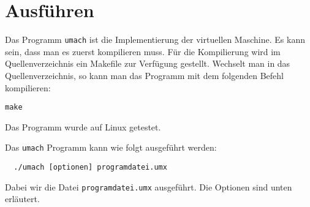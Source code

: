 \section{Ausführen}

Das Programm \texttt{umach} ist die Implementierung der virtuellen Maschine. Es
kann sein, dass man es zuerst kompilieren muss. Für die Kompilierung wird im
Quellenverzeichnis ein Makefile zur Verfügung gestellt. Wechselt man in
das Quellenverzeichnis, so kann man das Programm mit dem folgenden Befehl
kompilieren:
\begin{lstlisting}
make
\end{lstlisting}
Das Programm wurde auf Linux getestet.

Das \texttt{umach} Programm kann wie folgt ausgeführt werden:
\begin{lstlisting}
  ./umach [optionen] programdatei.umx
\end{lstlisting}

Dabei wir die Datei \texttt{programdatei.umx} ausgeführt. Die Optionen sind
unten erläutert.

